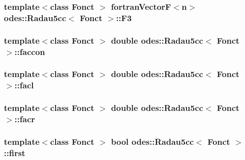 \subsubsection[{F3}]{\setlength{\rightskip}{0pt plus 5cm}template$<$class Fonct $>$ {\bf fortran\+Vector\+F}$<${\bf n}$>$ {\bf odes\+::\+Radau5cc}$<$ Fonct $>$\+::F3\hspace{0.3cm}{\ttfamily [protected]}}\label{classodes_1_1Radau5cc_a1382307c537eb6d6747b1b68b9a977ff}
\hypertarget{classodes_1_1Radau5cc_ae3cb85f022d29c80ae8f980e57f1bbf5}{}
\subsubsection[{faccon}]{\setlength{\rightskip}{0pt plus 5cm}template$<$class Fonct $>$ double {\bf odes\+::\+Radau5cc}$<$ Fonct $>$\+::faccon\hspace{0.3cm}{\ttfamily [private]}}\label{classodes_1_1Radau5cc_ae3cb85f022d29c80ae8f980e57f1bbf5}
\hypertarget{classodes_1_1Radau5cc_a13fe7121c4b03dca25bfb7b362032182}{}
\subsubsection[{facl}]{\setlength{\rightskip}{0pt plus 5cm}template$<$class Fonct $>$ double {\bf odes\+::\+Radau5cc}$<$ Fonct $>$\+::facl\hspace{0.3cm}{\ttfamily [private]}}\label{classodes_1_1Radau5cc_a13fe7121c4b03dca25bfb7b362032182}
\hypertarget{classodes_1_1Radau5cc_a2bda7f90bc9aabbc2d98ff14daeaa491}{}
\subsubsection[{facr}]{\setlength{\rightskip}{0pt plus 5cm}template$<$class Fonct $>$ double {\bf odes\+::\+Radau5cc}$<$ Fonct $>$\+::facr\hspace{0.3cm}{\ttfamily [private]}}\label{classodes_1_1Radau5cc_a2bda7f90bc9aabbc2d98ff14daeaa491}
\hypertarget{classodes_1_1Radau5cc_a788454a3dee88b6547430e881856fec7}{}
\subsubsection[{first}]{\setlength{\rightskip}{0pt plus 5cm}template$<$class Fonct $>$ bool {\bf odes\+::\+Radau5cc}$<$ Fonct $>$\+::first\hspace{0.3cm}{\ttfamily [private]}}\label{classodes_1_1Radau5cc_a788454a3dee88b6547430e881856fec7}
\hypertarget{classodes_1_1Radau5cc_a1a7b580bbae9fcd5c49fa116e877ac5c}{}

